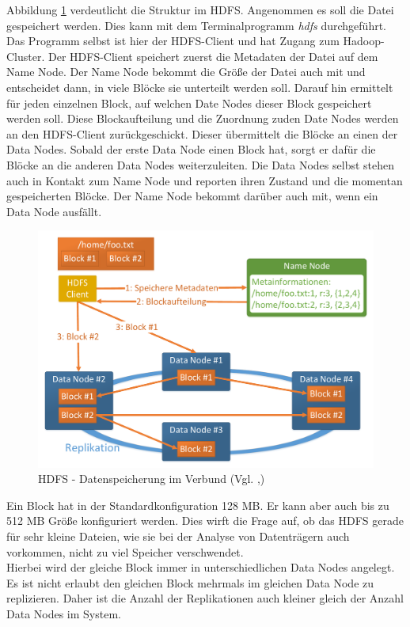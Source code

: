 \noindent
Abbildung \ref{fig:hdfs_cluster_architecture} verdeutlicht die Struktur im HDFS. Angenommen es soll die Datei  gespeichert werden. Dies kann mit dem Terminalprogramm \textit{hdfs} durchgeführt. Das Programm selbst ist hier der HDFS-Client und hat Zugang zum Hadoop-Cluster. Der HDFS-Client speichert zuerst die Metadaten der Datei auf dem Name Node. Der Name Node bekommt die Größe der Datei auch mit und entscheidet dann, in viele Blöcke sie unterteilt werden soll. Darauf hin ermittelt für jeden einzelnen Block, auf welchen Date Nodes dieser Block gespeichert werden soll. Diese Blockaufteilung und die Zuordnung zuden Date Nodes werden an den HDFS-Client zurückgeschickt. Dieser übermittelt die Blöcke an einen der Data Nodes. Sobald der erste Data Node einen Block hat, sorgt er dafür die Blöcke an die anderen Data Nodes weiterzuleiten. Die Data Nodes selbst stehen auch in Kontakt zum Name Node und reporten ihren Zustand und die momentan gespeicherten Blöcke. Der Name Node bekommt darüber auch mit, wenn ein Data Node ausfällt.

\begin{figure}[ht]
  \centering
  \includegraphics[width=\textwidth]{./resource/hdfs_cluster_architecture.pdf}
  \caption{HDFS - Datenspeicherung im Verbund (Vgl. \cite{hdfs_architecture},\cite{expert_hadoop_admin})}
  \label{fig:hdfs_cluster_architecture}
\end{figure}

\noindent
Ein Block hat in der Standardkonfiguration 128 MB. Er kann aber auch bis zu 512 MB Größe konfiguriert werden. Dies wirft die Frage auf, ob das HDFS gerade für sehr kleine Dateien, wie sie bei der Analyse von Datenträgern auch vorkommen, nicht zu viel Speicher verschwendet. \\
Hierbei wird der gleiche Block immer in unterschiedlichen Data Nodes angelegt. Es ist nicht erlaubt den gleichen Block mehrmals im gleichen Data Node zu replizieren. Daher ist die Anzahl der Replikationen auch kleiner gleich der Anzahl Data Nodes im System.

